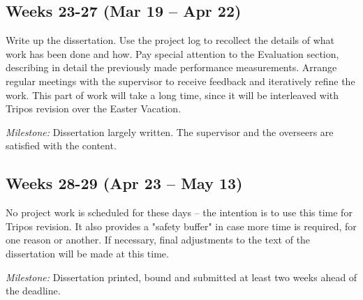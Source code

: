 \documentclass[a4paper, 12pt]{report}
\begin{document}
\begin{appendices}



\subsection*{Weeks 23-27 (Mar 19 -- Apr 22)}
Write up the dissertation. Use the project log to recollect the details of what work has been done and how. Pay special attention to the Evaluation section, describing in detail the previously made performance measurements. Arrange regular meetings with the supervisor to receive feedback and iteratively refine the work. This part of work will take a long time, since it will be interleaved with Tripos revision over the Easter Vacation.

\vspace{0.7\baselineskip}
\noindent
\textit{Milestone:} Dissertation largely written. The supervisor and the overseers are satisfied with the content.

\subsection*{Weeks 28-29 (Apr 23 -- May 13)}
No project work is scheduled for these days -- the intention is to use this time for Tripos revision. It also provides a "safety buffer" in case more time is required, for one reason or another. If necessary, final adjustments to the text of the dissertation will be made at this time.

\vspace{0.7\baselineskip}
\noindent
\textit{Milestone:} Dissertation printed, bound and submitted at least two weeks ahead of the deadline.
\end{appendices}
\end{document}
